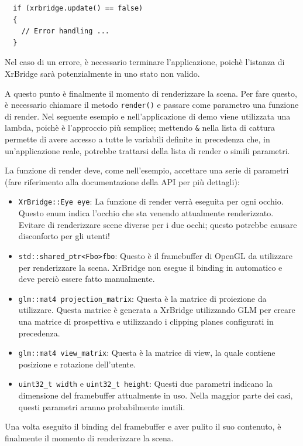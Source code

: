 \documentclass[twoside]{supsistudent}
\begin{document}
\begin{verbatim}
  if (xrbridge.update() == false)
  {
    // Error handling ...
  }
\end{verbatim}

Nel caso di un errore, è necessario terminare l'applicazione, poichè l'istanza di XrBridge sarà potenzialmente in uno stato non valido.

A questo punto è finalmente il momento di renderizzare la scena. Per fare questo, è necessario chiamare il metodo \texttt{render()} e passare come parametro una funzione di render. Nel seguente esempio e nell'applicazione di demo viene utilizzata una lambda, poichè è l'approccio più semplice; mettendo \texttt{\&} nella lista di cattura permette di avere accesso a tutte le variabili definite in precedenza che, in un'applicazione reale, potrebbe trattarsi della lista di render o simili parametri.

La funzione di render deve, come nell'esempio, accettare una serie di parametri (fare riferimento alla documentazione della API per più dettagli):

\begin{itemize}
  \item \texttt{XrBridge::Eye eye}: La funzione di render verrà eseguita per ogni occhio. Questo enum indica l'occhio che sta venendo attualmente renderizzato. Evitare di renderizzare scene diverse per i due occhi; questo potrebbe causare disconforto per gli utenti!
  \item \texttt{std::shared\_ptr<Fbo>fbo}: Questo è il framebuffer di OpenGL da utilizzare per renderizzare la scena. XrBridge non esegue il binding in automatico e deve perciò essere fatto manualmente.
  \item \texttt{glm::mat4 projection\_matrix}: Questa è la matrice di proiezione da utilizzare. Questa matrice è generata a XrBridge utilizzando GLM per creare una matrice di prospettiva e utilizzando i clipping planes configurati in precedenza.
  \item \texttt{glm::mat4 view\_matrix}: Questa è la matrice di view, la quale contiene posizione e rotazione dell'utente.
  \item \texttt{uint32\_t width} e \texttt{uint32\_t height}: Questi due parametri indicano la dimensione del framebuffer attualmente in uso. Nella maggior parte dei casi, questi parametri aranno probabilmente inutili.
\end{itemize}

Una volta eseguito il binding del framebuffer e aver pulito il suo contenuto, è finalmente il momento di renderizzare la scena.
\end{document}
